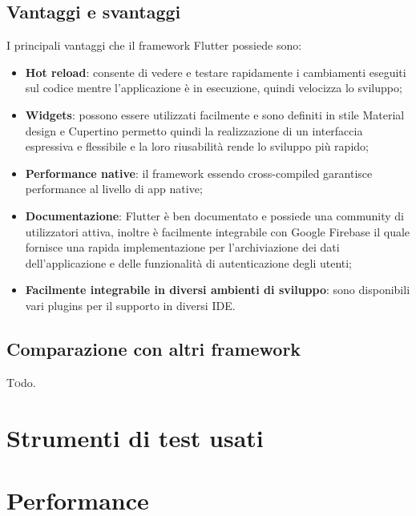 \subsection{Vantaggi e svantaggi\label{sec:flutter-vantaggi}}
I principali vantaggi che il framework Flutter possiede sono:
\begin{itemize}
	\item \textbf{Hot reload}: consente di vedere e testare rapidamente i cambiamenti eseguiti sul codice mentre l'applicazione è in esecuzione, quindi velocizza lo sviluppo;
	\item \textbf{Widgets}: possono essere utilizzati facilmente e sono definiti in stile Material design e Cupertino permetto quindi la realizzazione di un interfaccia espressiva e flessibile e la loro riusabilità rende lo sviluppo più rapido; 
	\item \textbf{Performance native}: il framework essendo cross-compiled garantisce performance al livello di app native;
	\item \textbf{Documentazione}: Flutter è ben documentato e possiede una community di utilizzatori attiva, inoltre è facilmente integrabile con Google Firebase il quale fornisce una rapida implementazione per l'archiviazione dei dati dell'applicazione e delle funzionalità di autenticazione degli utenti;
	\item \textbf{Facilmente integrabile in diversi ambienti di sviluppo}: sono disponibili vari plugins per il supporto in diversi IDE.
\end{itemize}
\subsection{Comparazione con altri framework\label{sec:flutter-comparazione}}
\lettrine[findent=1.5em]{T}odo.

\section{Strumenti di test usati}

\section{Performance}

